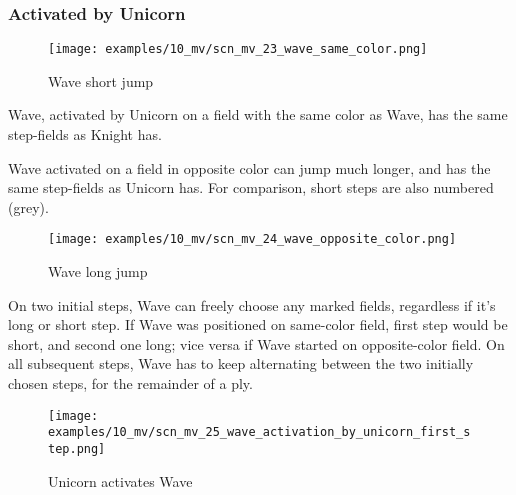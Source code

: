 \subsubsection*{Activated by Unicorn}
\label{sec:Miranda's veil/Wave/Movement/Activated by Unicorn}

\vspace*{-0.7\baselineskip}
\noindent
\begin{wrapfigure}[10]{l}{0.45\textwidth}
\centering
\texttt{[image: examples/10\_mv/scn\_mv\_23\_wave\_same\_color.png]}
\vspace*{-0.3\baselineskip}
\caption{Wave short jump}
\label{fig:scn_mv_23_wave_same_color}
\end{wrapfigure}
Wave, activated by Unicorn on a field with the same color as Wave, has the same step-fields
as Knight has.

Wave activated on a field in opposite color can jump much longer, and has the same step-fields
as Unicorn has. For comparison, short steps are also numbered (grey).

\vspace*{0.7\baselineskip}
\noindent
\begin{wrapfigure}[18]{l}{0.7\textwidth}
\centering
\texttt{[image: examples/10\_mv/scn\_mv\_24\_wave\_opposite\_color.png]}
\vspace*{-0.3\baselineskip}
\caption{Wave long jump}
\label{fig:scn_mv_24_wave_opposite_color}
\end{wrapfigure}
On two initial steps, Wave can freely choose any marked fields, regardless if it's long or short step.
If Wave was positioned on same-color field, first step would be short, and second one long; vice versa
if Wave started on opposite-color field. On all subsequent steps, Wave has to keep alternating between
the two initially chosen steps, for the remainder of a ply.

\clearpage %

\vspace*{-2.1\baselineskip}
\noindent
\begin{figure}[!h]
\texttt{[image: examples/10\_mv/scn\_mv\_25\_wave\_activation\_by\_unicorn\_first\_step.png]}
\vspace*{-1.3\baselineskip}
\caption{Unicorn activates Wave}
\label{fig:scn_mv_25_wave_activation_by_unicorn_first_step}
\end{figure}

